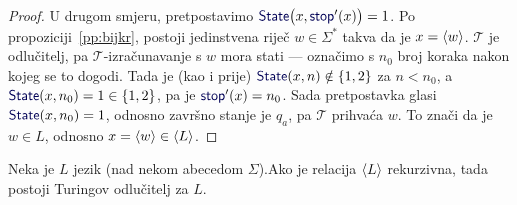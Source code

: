 \begin{proof}
U drugom smjeru, pretpostavimo $\f{State}\bigl(x,\f{stop}'(x)\bigr)=1$. Po propoziciji~\ref{pp:bijkr}, postoji jedinstvena riječ $w\in\Sigma^*$ takva da je $x=\langle w\rangle$. $\mathcal T$ je odlučitelj, pa $\mathcal T$\!-izračunavanje s $w$ mora stati --- označimo s $n_0$ broj koraka nakon kojeg se to dogodi. Tada je (kao i prije) $\f{State}(x,n)\notin\{1,2\}$ za $n<n_0$, a $\f{State}(x,n_0)=1\in\{1,2\}$, pa je $\f{stop}'(x)=n_0$. Sada pretpostavka glasi $\f{State}(x,n_0)=1$, odnosno završno stanje je $q_a$, pa $\mathcal T$ prihvaća $w$. To znači da je $w\in L$, odnosno $x=\langle w\rangle\in\langle L\rangle$.
\end{proof}

\begin{teorem}[{name=[Turing-odlučivost rekurzivnog jezika]}]\label{tm:krio}
Neka je $L$ jezik (nad nekom abecedom $\Sigma$).\newline Ako je relacija $\langle L\rangle$ rekurzivna, tada postoji Turingov odlučitelj za $L$.
\end{teorem}
